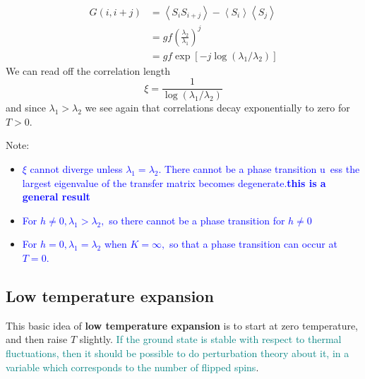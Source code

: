 \documentclass[12pt,titlepage]{article}
\numberwithin{equation}{section}
\begin{document}
\begin{equation}
\begin{aligned} G(i, i+j) &=\left\langle S_{i} S_{i+j}\right\rangle-\left\langle S_{i}\right\rangle\left\langle S_{j}\right\rangle \\ &= g f\left(\frac{\lambda_{2}}{\lambda_{1}}\right)^{j} \\ &=g f \exp \left[-j \log \left(\lambda_{1} / \lambda_{2}\right)\right] \end{aligned}
\end{equation}
We can read off the correlation length
\begin{equation}
\xi=\frac{1}{\log \left(\lambda_{1} / \lambda_{2}\right)}
\end{equation}
and since $\lambda_{1}>\lambda_{2}$ we see again that correlations decay exponentially to zero for $T>0$.

Note:
\begin{itemize}
    \item \textcolor{blue}{$\xi$ cannot diverge unless $\lambda_{1}=\lambda_{2} .$ There cannot be a phase transition u~ess the largest eigenvalue of the transfer matrix becomes degenerate.\textbf{this is a general result}}
    \item \textcolor{blue}{For $h \neq 0, \lambda_{1}>\lambda_{2},$ so there cannot be a phase transition for $h \neq 0$}
    \item \textcolor{blue}{For $h=0, \lambda_{1}=\lambda_{2}$ when $K=\infty,$ so that a phase transition can occur at $T=0$.}
\end{itemize}
\subsection{Low temperature expansion}
This basic idea of \textbf{low temperature expansion} is to start at zero temperature, and then raise $T$ slightly. \textcolor{teal}{If the ground state is stable with respect to thermal fluctuations, then it should be possible to do perturbation theory about it, in a variable which corresponds to the number of flipped spins}.
\end{document}
